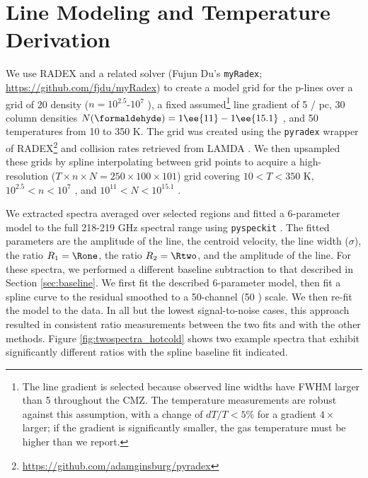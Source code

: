 \section{Line Modeling and Temperature Derivation}
\label{sec:linemodeling}
%
We use RADEX \citet{van-Der-Tak2007a} and a related solver (Fujun Du's
\texttt{myRadex}; \url{https://github.com/fjdu/myRadex}) to create a model grid
for the p-\formaldehyde lines over a grid of 20 density ($n=10^{2.5}$-$10^{7}$
\percc), a fixed assumed\footnote{The line gradient is selected because observed line widths have
FWHM larger than 5 \kms throughout the CMZ.  The temperature measurements are
robust against this assumption, with a change of $dT/T < 5\%$ for a gradient
$4\times$ larger; if the gradient is significantly smaller, the gas temperature
must be higher than we report.} line gradient of 5 \kms / pc, 30 \formaldehyde
column densities $N(\formaldehyde) = 1\ee{11}-1\ee{15.1}$ \persc, and 50
temperatures from 10 to 350 K.  The grid was created using the \texttt{pyradex}
wrapper of RADEX\footnote{\url{https://github.com/adamginsburg/pyradex}} and
collision rates retrieved from LAMDA \citep{Wiesenfeld2003a}.  We then
upsampled these grids by spline interpolating between grid points to acquire a
high-resolution ($T\times n \times N = 250\times100\times101$) grid covering
$10<T<350$ K, $10^{2.5} < n < 10^7$ \percc, and $10^{11} < N < 10^{15.1}$
\persc\perkmspc.

We extracted spectra averaged over selected regions and fitted
a 6-parameter model to the full 218-219 GHz spectral range using
\texttt{pyspeckit} \citep{Ginsburg2011c}.  The fitted parameters are the amplitude of the
\formaldehyde \threeohthree line, the centroid velocity, the line width
($\sigma$), the ratio $R_1 = \Rone$, the ratio $R_2 = \Rtwo$, and the
amplitude of the \methanol \fourtwotwo line.  For these spectra, we performed
a different baseline subtraction to that described in Section
\ref{sec:baseline}.  We first fit the described 6-parameter model, then fit a
spline curve to the residual smoothed to a 50-channel (50 \kms) scale.  We then
re-fit the model to the data.  In all but the lowest signal-to-noise cases,
this approach resulted in consistent ratio measurements between the two fits
and with the other methods.  Figure \ref{fig:twospectra_hotcold} shows two
example spectra that exhibit significantly different ratios with the spline
baseline fit indicated.

